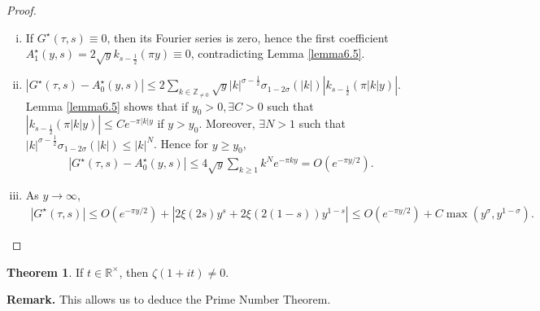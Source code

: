 \documentclass{article}
\theoremstyle{definition}
\newtheorem{theorem}{Theorem}[section]
\begin{document}
\begin{proof}
    \begin{enumerate}[(i)]
        \item If $G^{\star}(\tau,s) \equiv 0$, then its Fourier series is zero, hence the first coefficient $A_1^\star(y,s) = 2\sqrt{y}k_{s-\frac{1}{2}}(\pi y) \equiv 0$, contradicting Lemma \ref{lemma6.5}.
        \item $|G^{\star}(\tau,s) - A_0^{\star}(y,s)|\le 2\sum_{k \in \mathbb{Z}_{\neq 0}}^{} \sqrt{y}|k|^{\sigma-\frac{1}{2}}\sigma_{1-2\sigma}(|k|)|k_{s-\frac{1}{2}}(\pi |k| y)|$. Lemma \ref{lemma6.5} shows that if $y_0>0, \exists C>0$ such that $|k_{s-\frac{1}{2}}(\pi |k|y)|\le Ce^{-\pi|k|y}$ if $y>y_0$. Moreover, $\exists N> 1$ such that $|k|^{\sigma-\frac{1}{2}}\sigma_{1-2\sigma}(|k|)\le |k|^N$. Hence for $y\ge y_0$,
        \begin{align*}
            |G^{\star}(\tau,s)-A_0^{\star}(y,s)|\le 4\sqrt{y}\sum_{k\ge 1}^{} k^Ne^{-\pi k y} = O(e^{-\pi y/2}).
        \end{align*}
        \item As $y \to \infty$, \begin{align*}
            |G^{\star}(\tau,s)| \le O(e^{-\pi y/2}) + |2\xi(2s)y^s+2\xi(2(1-s))y^{1-s}|\le O(e^{-\pi y/2}) + C \max(y^{\sigma},y^{1-\sigma}).
        \end{align*}
    \end{enumerate}
\end{proof}
\begin{theorem}
    If $t \in \mathbb{R}^\times$, then $\zeta(1+it) \neq 0$. 
\end{theorem}
\textbf{Remark.} This allows us to deduce the Prime Number Theorem.
\end{document}
